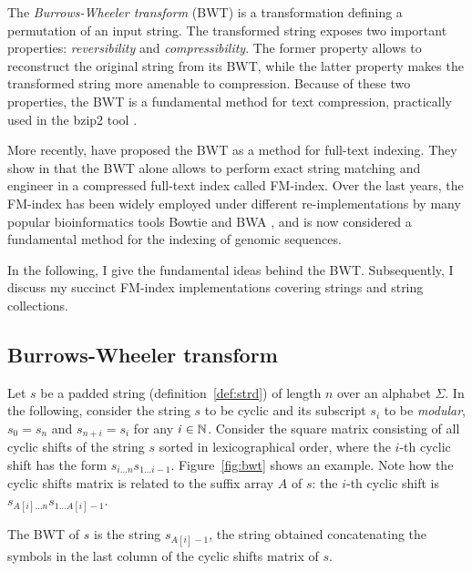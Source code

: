The \emph{Burrows-Wheeler transform} (BWT) \citep{Burrows1994} is a transformation defining a permutation of an input string.
The transformed string exposes two important properties: \emph{reversibility} and \emph{compressibility}.
The former property allows to reconstruct the original string from its BWT, while the latter property makes the transformed string more amenable to compression.
Because of these two properties, the BWT is a fundamental method for text compression, practically used in the bzip2 tool \citep{Seward1996}.

More recently, \citeauthor{Ferragina2000} have proposed the BWT as a method for full-text indexing.
They show in \citep{Ferragina2000} that the BWT alone allows to perform exact string matching and engineer in \citep{Ferragina2001} a compressed full-text index called FM-index.
Over the last years, the FM-index has been widely employed under different re-implementations by many popular bioinformatics tools \eg Bowtie \citep{Langmead2009} and BWA \citep{Li2009}, and is now considered a fundamental method for the indexing of genomic sequences.

In the following, I give the fundamental ideas behind the BWT.
Subsequently, I discuss my succinct FM-index implementations covering strings and string collections.

\subsection{Burrows-Wheeler transform}

Let $s$ be a padded string (definition~\ref{def:strd}) of length $n$ over an alphabet $\Sigma$.
In the following, consider the string $s$ to be cyclic and its subscript $s_i$ to be \emph{modular}, \eg $s_0 = s_{n}$ and $s_{n+i} = s_i$ for any $i \in \mathbb {N}$.
Consider the square matrix consisting of all cyclic shifts of the string $s$ sorted in lexicographical order, where the $i$-th cyclic shift has the form $s_{i \dots n} s_{1 \dots i-1}$.
Figure~\ref{fig:bwt} shows an example.
Note how the cyclic shifts matrix is related to the suffix array $A$ of $s$: the $i$-th cyclic shift is $s_{A[i] \dots n} s_{1 \dots A[i]-1}$.

\begin{definition}
\label{def:bwt}
The BWT of $s$ is the string $s_{A[i]-1}$, \ie the string obtained concatenating the symbols in the last column of the cyclic shifts matrix of $s$.
\end{definition}

